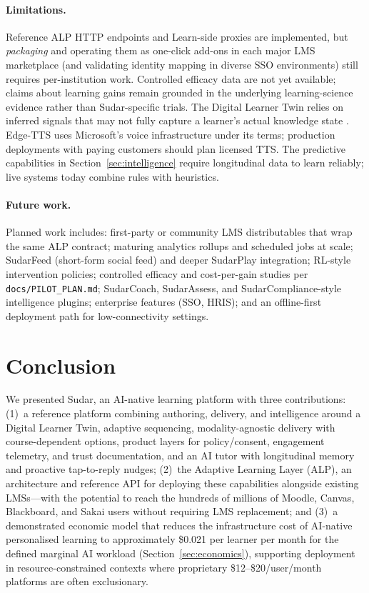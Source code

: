 \documentclass[10pt,twocolumn]{article}
\begin{document}
\paragraph{Limitations.}
Reference ALP HTTP endpoints and Learn-side proxies are implemented,
but \emph{packaging} and operating them as one-click add-ons in each
major LMS marketplace (and validating identity mapping in diverse SSO
environments) still requires per-institution work. Controlled efficacy
data are not yet available; claims about learning gains remain grounded
in the underlying learning-science evidence rather than
Sudar-specific trials. The Digital Learner Twin relies on inferred
signals that may not fully capture a learner's actual knowledge
state \cite{self1988,bull2016}. Edge-TTS uses Microsoft's voice
infrastructure under its terms; production deployments with paying
customers should plan licensed TTS. The predictive capabilities in
Section~\ref{sec:intelligence} require longitudinal data to learn
reliably; live systems today combine rules with heuristics.

\paragraph{Future work.}
Planned work includes: first-party or community LMS distributables
that wrap the same ALP contract; maturing analytics rollups and
scheduled jobs at scale; SudarFeed (short-form social feed) and deeper
SudarPlay integration; RL-style intervention policies; controlled
efficacy and cost-per-gain studies per \texttt{docs/PILOT\_PLAN.md};
SudarCoach, SudarAssess, and SudarCompliance-style intelligence
plugins; enterprise features (SSO, HRIS); and an offline-first
deployment path for low-connectivity settings.

\section{Conclusion}
\label{sec:conclusion}

We presented Sudar, an AI-native learning platform with three
contributions: (1)~a reference platform combining authoring, delivery,
and intelligence around a Digital Learner Twin, adaptive sequencing,
modality-agnostic delivery with course-dependent options, product
layers for policy/consent, engagement telemetry, and trust documentation,
and an AI tutor with longitudinal memory and proactive tap-to-reply
nudges; (2)~the Adaptive Learning Layer (ALP), an architecture and
reference API for deploying these capabilities alongside existing
LMSs---with the potential to reach the hundreds of millions
of Moodle, Canvas, Blackboard, and Sakai users \cite{moodle2025stats}
without requiring LMS replacement; and (3)~a demonstrated economic
model that reduces the infrastructure cost of AI-native personalised
learning to approximately \$0.021 per learner per month for the defined
marginal AI workload (Section~\ref{sec:economics}), supporting
deployment in resource-constrained contexts where proprietary
\$12--\$20/user/month platforms are often exclusionary.
\end{document}
